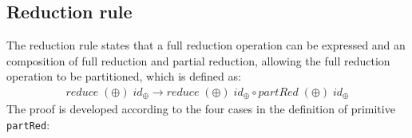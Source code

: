 \documentclass{l4proj}
\begin{document}
\subsection{Reduction rule}
\label{alg:reduction}
The reduction rule states that a full reduction operation can be expressed and an composition of full reduction and partial reduction, allowing the full reduction operation to be partitioned, which is defined as:
\begin{align}
    \label{reduction}
    reduce\; (\oplus)\; id_\oplus \to reduce\; (\oplus)\; id_\oplus \circ partRed\; (\oplus)\; id_\oplus
\end{align}
The proof is developed according to the four cases in the definition of primitive \texttt{partRed}:
\newpage %
\begin{code}%
\>[0]\<%
\\
\>[0]\AgdaSpace{}%
\AgdaSymbol{:}%
\>[1755I]\AgdaSymbol{\{}\AgdaSpace{}%
\AgdaSymbol{:}\AgdaSpace{}%
\AgdaSymbol{\}}\AgdaSpace{}%
\AgdaSpace{}%
\AgdaSymbol{\{}\AgdaSpace{}%
\AgdaSymbol{:}\AgdaSpace{}%
\AgdaSymbol{\}}\AgdaSpace{}%
\AgdaSpace{}%
\AgdaSymbol{(}\AgdaSpace{}%
\AgdaSymbol{:}\AgdaSpace{}%
\AgdaSymbol{)}\AgdaSpace{}%
\<%
\\
\>[.][@{}l@{}]\<[1755I]%
\>[12]\AgdaSymbol{(}\AgdaSpace{}%
\AgdaSymbol{:}\AgdaSpace{}%
\AgdaSpace{}%
\AgdaSymbol{)}\AgdaSpace{}%
\AgdaSpace{}%
\AgdaSymbol{(}\AgdaSpace{}%
\AgdaSymbol{:}\AgdaSpace{}%
\AgdaSpace{}%
\AgdaSpace{}%
\AgdaSymbol{(}\AgdaSpace{}%
\AgdaSpace{}%
\AgdaOperator{\AgdaPrimitive{*}}\AgdaSpace{}%
\AgdaSymbol{))}\AgdaSpace{}%
\<%
\\
%
\>[12]\AgdaSymbol{(}\AgdaSpace{}%
\AgdaSpace{}%
\AgdaSpace{}%
\AgdaSpace{}%
\AgdaSpace{}%
\AgdaSymbol{\{}\AgdaSymbol{\}}\AgdaSpace{}%
\AgdaSymbol{)}\AgdaSpace{}%
\AgdaSpace{}%
\AgdaSpace{}%
\AgdaSpace{}%
\AgdaSpace{}%
\<%
\\
\>[0]\<%
\\

\end{code}
\end{document}

